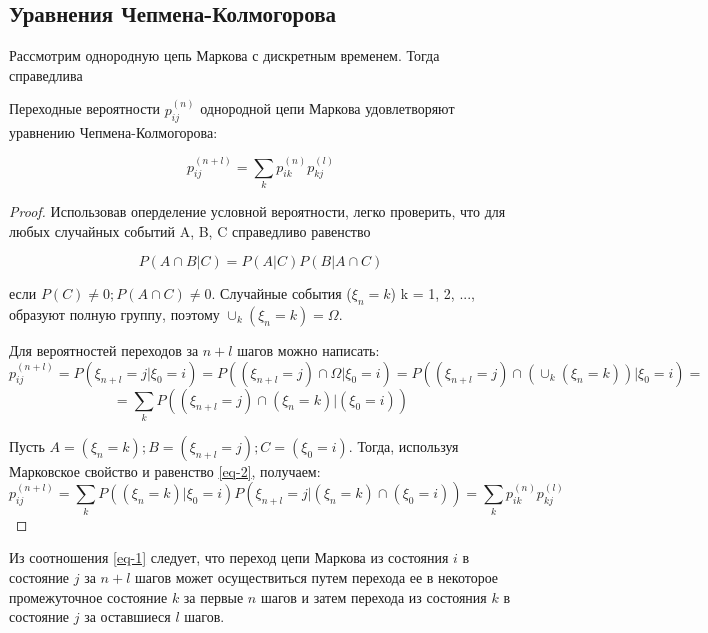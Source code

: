 \subsection{Уравнения Чепмена-Колмогорова} 

Рассмотрим однородную цепь Маркова с дискретным временем. Тогда справедлива 
\par\medskip

\begin{theorem} Переходные вероятности $p_{ij}^{(n)}$ однородной цепи Маркова удовлетворяют уравнению Чепмена-Колмогорова:

\begin{equation}\label{eq-1}
	p_{ij}^{(n + l)} = \sum_{k}p_{ik}^{(n)}p_{kj}^{(l)}	
\end{equation}
\end{theorem}

\begin{proof} 

Использовав оперделение условной вероятности, легко проверить, что для любых случайных событий A, B, C справедливо равенство

\normalmarginpar
\begin{equation}\label{eq-2}
	P(A \cap B | C ) = P (A | C)P(B | A \cap C)
\end{equation}

если $P(C) \neq 0; P(A \cap C) \neq 0$. Случайные события ($\xi_n = k$) k = 1, 2, ..., образуют полную группу, поэтому $\cup_k (\xi_n = k) = \Omega$.
\par\medskip

Для вероятностей переходов за $n + l$ шагов можно написать:
$$p_{ij}^{(n + l)} = P(\xi_{n + l} = j | \xi_0 = i) = P((\xi_{n + l} = j)  \cap \Omega | \xi_0 = i) = P((\xi_{n + l} = j)  \cap (\cup_{k} (\xi_n = k)) | \xi_0 = i) =$$
$$ =  \sum_{k} P((\xi_{n + l} = j)  \cap(\xi_n = k) | (\xi_0 = i))$$

Пусть $A = (\xi_n = k); B = (\xi_{n + l} = j); C = (\xi_0 = i)$. Тогда, используя Марковское свойство и равенство \eqref{eq-2}, получаем:
$$p_{ij}^{(n + l)} = \sum_{k} P((\xi_{n} = k) | \xi_0 = i) P(\xi_{n + l} = j | (\xi_n = k) \cap (\xi_0 = i)) = \sum_{k} p_{ik}^{(n)} p_{kj}^{(l)}$$

\end{proof}
\par\medskip
 
Из соотношения \eqref{eq-1} следует, что переход цепи Маркова из состояния $i$ в состояние $j$ за $n + l$ шагов может осуществиться путем перехода ее в некоторое промежуточное состояние $k$ за первые $n$ шагов и затем перехода из состояния $k$ в состояние $j$ за оставшиеся $l$ шагов.
\par\medskip
 
